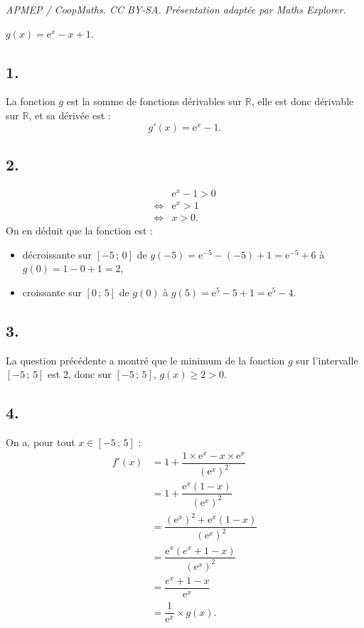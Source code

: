 \documentclass[10pt]{article}
\providecommand{\e}{{\mathrm{e}}}
\begin{document}
\noindent\textit{APMEP / CoopMaths. CC BY-SA. Présentation adaptée par Maths Explorer.}\par\medskip
\(g(x) = \e^x - x + 1\).

\subsection*{1.}

La fonction \(g\) est la somme de fonctions dérivables sur \(\mathbb{R}\), elle est donc dérivable sur \(\mathbb{R}\), et sa dérivée est :
\[
g'(x) = \e^x - 1.
\]

\subsection*{2.}

\begin{align*}
&\e^x - 1 > 0 \\
\iff &\e^x > 1 \\
\iff &x > 0.
\end{align*}
On en déduit que la fonction est :
\begin{itemize}[label=-]
    \item décroissante sur \([-5\,;\,0]\) de \(g(-5) = \e^{-5} - (-5) + 1 = \e^{-5} + 6\) à \(g(0) = 1 - 0 + 1 = 2\),
    \item croissante sur \([0\,;\,5]\) de \(g(0)\) à \(g(5) = \e^{5} - 5 + 1 = \e^{5} - 4\).
\end{itemize}

\subsection*{3.}

La question précédente a montré que le minimum de la fonction \(g\) sur l'intervalle \([-5\,;\,5]\) est \(2\), donc sur \([-5\,;\,5]\), \(g(x) \geqslant 2 > 0\).

\subsection*{4.}

On a, pour tout \(x \in [-5\,;\,5]\) :
\begin{align*}
f'(x) &= 1 + \dfrac{1 \times \e^x - x \times \e^x}{(\e^x)^2} \\
&= 1 + \dfrac{\e^x(1 - x)}{(\e^x)^2} \\
&= \dfrac{(\e^x)^2 + \e^x(1 - x)}{(\e^x)^2} \\
&= \dfrac{\e^x(e^x + 1 - x)}{(\e^x)^2} \\
&= \dfrac{e^x + 1 - x}{\e^x} \\
&= \dfrac{1}{\e^x} \times g(x).
\end{align*}
\end{document}
